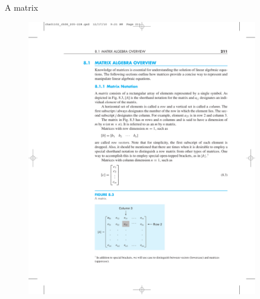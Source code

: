 \documentclass[xcolor=svgnames,t,10pt,allowframebreaks]{beamer}
\begin{document}
\begin{frame}[label={sec:orga29f205}]{A matrix}
\begin{figure}[H]

\includegraphics[width=0.9\textwidth]{fig/matrix-base.pdf}
\end{figure}
\end{frame}
\end{document}
